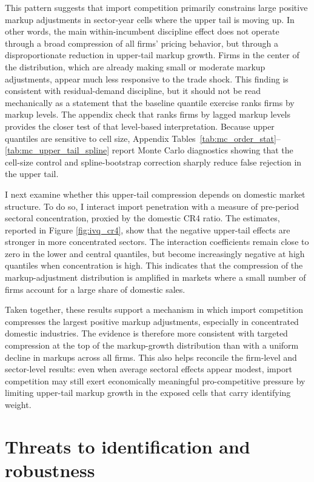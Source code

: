 \documentclass[12pt]{article}
\begin{document}
This pattern suggests that import competition primarily constrains large positive markup adjustments in sector-year cells where the upper tail is moving up. In other words, the main within-incumbent discipline effect does not operate through a broad compression of all firms' pricing behavior, but through a disproportionate reduction in upper-tail markup growth. Firms in the center of the distribution, which are already making small or moderate markup adjustments, appear much less responsive to the trade shock. This finding is consistent with residual-demand discipline, but it should not be read mechanically as a statement that the baseline quantile exercise ranks firms by markup levels. The appendix check that ranks firms by lagged markup levels provides the closer test of that level-based interpretation. Because upper quantiles are sensitive to cell size, Appendix Tables~\ref{tab:mc_order_stat}--\ref{tab:mc_upper_tail_spline} report Monte Carlo diagnostics showing that the cell-size control and spline-bootstrap correction sharply reduce false rejection in the upper tail.

I next examine whether this upper-tail compression depends on domestic market structure. To do so, I interact import penetration with a measure of pre-period sectoral concentration, proxied by the domestic CR4 ratio. The estimates, reported in Figure \ref{fig:ivq_cr4}, show that the negative upper-tail effects are stronger in more concentrated sectors. The interaction coefficients remain close to zero in the lower and central quantiles, but become increasingly negative at high quantiles when concentration is high. This indicates that the compression of the markup-adjustment distribution is amplified in markets where a small number of firms account for a large share of domestic sales.

Taken together, these results support a mechanism in which import competition compresses the largest positive markup adjustments, especially in concentrated domestic industries. The evidence is therefore more consistent with targeted compression at the top of the markup-growth distribution than with a uniform decline in markups across all firms. This also helps reconcile the firm-level and sector-level results: even when average sectoral effects appear modest, import competition may still exert economically meaningful pro-competitive pressure by limiting upper-tail markup growth in the exposed cells that carry identifying weight.

\section{Threats to identification and robustness}
\end{document}

